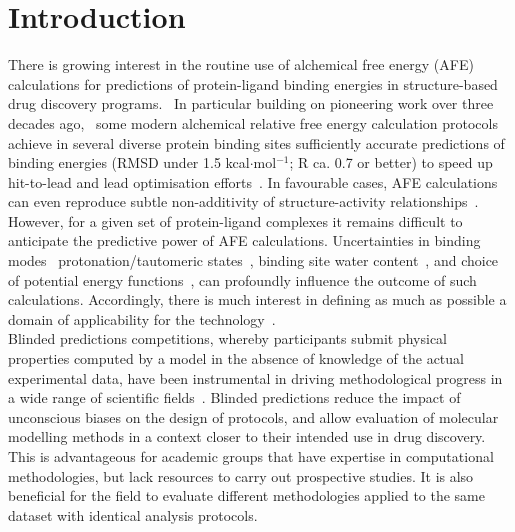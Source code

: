 \documentclass{svjour3}                     %
\begin{document}
\section{Introduction}
\label{sec:intro}
There is growing interest in the routine use of alchemical free energy (AFE) calculations for predictions of protein-ligand binding energies in structure-based drug discovery programs.~\cite{DengRoux2006,ChangGilson2004,Michel2014,ChoderaMobleyShirtsEtAl2011,JiangRoux2010,MichelFoloppeEssex2010,MichelEssex2010}  In particular building on pioneering work over three decades ago,~\cite{FEP,TembreCammon1984} some modern alchemical relative free energy calculation protocols achieve in several diverse protein binding sites sufficiently accurate predictions of binding energies (RMSD under 1.5 kcal$\cdot$mol$^{-1}$; R ca. 0.7 or better) to speed up hit-to-lead and lead optimisation efforts~\cite{WangWuDengEtAl2015}. In favourable cases, AFE calculations can even reproduce subtle non-additivity of structure-activity relationships~\cite{CalabroWoodsPowleslandEtAl2016}. 
However, for a given set of protein-ligand complexes it remains difficult to anticipate the predictive power of AFE calculations. Uncertainties in binding modes~\cite{LimWangAbelEtAl2016,MichelVerdonkEssex2007,MichelEssex2008} protonation/tautomeric states~\cite{HuSherborneLeeEtAl2016,EvoliMobleyGuzziEtAl2016}, binding site water content~\cite{LuccarelliMichelTirado-RivesEtAl2010,MichelTirado-RivesJorgensen2009,MichelTirado-RivesJorgensen2009a}, and choice of potential energy functions~\cite{MishraCalabroLoefflerEtAl2015,MichelVerdonkEssex2006}, can profoundly influence the outcome of such calculations. Accordingly, there is much interest in defining as much as possible a domain of applicability for the technology~\cite{SherborneShanmugasundaramChengEtAl2016}.
\\

 Blinded predictions competitions, whereby participants submit physical properties computed by a model in the absence of knowledge of the actual experimental data, have been instrumental in driving methodological progress in a wide range of scientific fields~\cite{KryshtafovychFidelisMoult2014,WodakMendez2004,Yin2017,SmithDunbarUngEtAl2011}. Blinded predictions reduce the impact of unconscious biases on the design of protocols, and allow evaluation of molecular modelling methods in a context closer to their intended use in drug discovery. This is advantageous for academic groups that have expertise in computational methodologies, but lack resources to carry out prospective studies. It is also beneficial for the field to evaluate different methodologies applied to the same dataset with identical analysis protocols.
 \\
 
\end{document}
